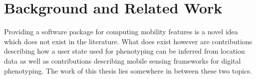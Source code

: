 \chapter{Background and Related Work}
\label{chapter:02}
Providing a software package for computing mobility features is a novel idea which does not exist in the literature. What does exist however are contributions describing how a user state used for phenotyping can be inferred from location data as well as contributions describing mobile sensing frameworks for digital phenotyping. The work of this thesis lies somewhere in between these two topics.





